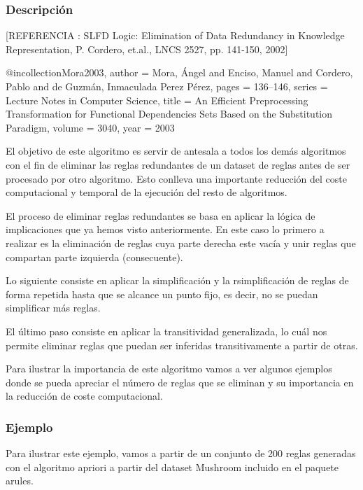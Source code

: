 \subsubsection{Descripci\'on} 

[REFERENCIA :  
SLFD Logic: Elimination of Data Redundancy in Knowledge Representation, P. Cordero, et.al., LNCS 2527, pp. 141-150, 2002]

@incollection{Mora2003,
author = {Mora, {\'{A}}ngel and Enciso, Manuel and Cordero, Pablo and de Guzm{\'{a}}n, Inmaculada Perez P{\'{e}}rez},
pages = {136--146},
series = {Lecture Notes in Computer Science},
title = {{An Efficient Preprocessing Transformation for Functional Dependencies Sets Based on the Substitution Paradigm}},
volume = {3040},
year = {2003}
}

El objetivo de este algoritmo es servir de antesala a todos los dem\'as algoritmos con el fin de eliminar las reglas redundantes de un dataset de reglas antes de ser procesado por otro algoritmo. Esto conlleva una importante reducci\'on del coste computacional y temporal de la ejecuci\'on del resto de algoritmos.

El proceso de eliminar reglas redundantes se basa en aplicar la l\'ogica de implicaciones que ya hemos visto anteriormente. En este caso lo primero a realizar es la eliminaci\'on de reglas cuya parte derecha este vac\'ia y unir reglas que compartan parte izquierda (consecuente).

Lo siguiente consiste en aplicar la simplificaci\'on y la rsimplificaci\'on de reglas de forma repetida hasta que se alcance un punto fijo, es decir, no se puedan simplificar m\'as reglas.

El \'ultimo paso consiste en aplicar la transitividad generalizada, lo cu\'al nos permite eliminar reglas que puedan ser inferidas transitivamente a partir de otras.

Para ilustrar la importancia de este algoritmo vamos a ver algunos ejemplos donde se pueda apreciar el n\'umero de reglas que se eliminan y su importancia en la reducci\'on de coste computacional.

\subsubsection{Ejemplo}

Para ilustrar este ejemplo, vamos a partir de un conjunto de 200 reglas generadas con el algoritmo apriori a partir del dataset Mushroom incluido en el paquete arules.

